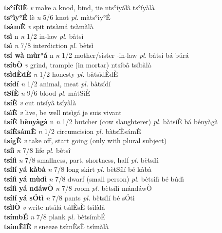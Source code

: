 \documentclass{article}
\begin{document}
{\bf ts°íÈlÈ}  {\it v} make a knod, bind, tie   nts°íyálâ   ts°íyàlà   \\ 
{\bf ts°ìy°É} lè {\it n} 5/6 knot {\it pl.} màts°ìy°É         \\ 
{\bf tsàmÈ}  {\it v} spit   ntsàmá   tsàmàlà   \\ 
{\bf tsì} n {\it n} 1/2 in-law {\it pl.} bàtsì         \\ 
{\bf tsì}  {\it n} 7/8 interdiction {\it pl.} bètsì         \\ 
{\bf tsí wà mùr°á} n {\it n} 1/2 mother/sister -in-law {\it pl.} bàtsí bá búrá         \\ 
{\bf tsíbÒ}  {\it v} grind, trample (in mortar)   ntsíbâ   tsíbàlà   \\ 
{\bf tsìdÈdÈ}  {\it n} 1/2 honesty {\it pl.} bàtsìdÈdÈ         \\ 
{\bf tsídí}  {\it n} 1/2 animal, meat {\it pl.} bàtsídí         \\ 
{\bf tSíÈ}  {\it n} 9/6 blood {\it pl.} màtSíÈ         \\ 
{\bf tsíÈ}  {\it v} cut   ntsíyâ   tsíyàlà   \\ 
{\bf tsìÈ}  {\it v} live, be well   ntsìgá je suis vivant      \\ 
{\bf tsíÈ bènyàgà} n {\it n} 1/2 butcher (cow slaughterer) {\it pl.} bàtsíÈ bá bényàgà         \\ 
{\bf tsíÈsámÈ}  {\it n} 1/2 circumcision {\it pl.} bàtsíÈsámÈ         \\ 
{\bf tsígÈ}  {\it v} take off, start going (only with plural subject)         \\ 
{\bf tsíì}  {\it n} 7/8 life {\it pl.} bètsî         \\ 
{\bf tsílì}  {\it n} 7/8 smallness, part, shortness, half {\it pl.} bètsílì         \\ 
{\bf tsílí yá kàbà}  {\it n} 7/8 long skirt {\it pl.} bètSílí bé kàbà         \\ 
{\bf tsílì yá mùdì}  {\it n} 7/8 dwarf (small person) {\it pl.} bètsílì bé búdì         \\ 
{\bf tsílì yá ndáwÒ}  {\it n} 7/8 room {\it pl.} bètsílì mándáwÒ         \\ 
{\bf tsílí yá sÓtì}  {\it n} 7/8  pants {\it pl.} bètsílí bé sÓtì         \\ 
{\bf tsìlÒ}  {\it v} write   ntsìlá  tsìlÈsÈ tsìlàlà   \\ 
{\bf tsímbÉ}  {\it n} 7/8 plank {\it pl.} bètsímbÉ         \\ 
{\bf tsímÈlÈ}  {\it v} sneeze     tsímÈsÈ tsímàlà   \\ 
\end{document}
